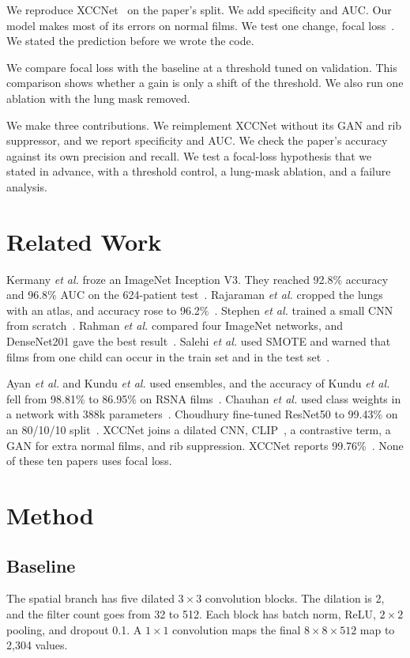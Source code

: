 \documentclass[conference]{IEEEtran}
\begin{document}
We reproduce XCCNet~\cite{raghaw2024} on the paper's split. We add specificity and AUC. Our model makes most of its errors on normal films. We test one change, focal loss~\cite{lin2017}. We stated the prediction before we wrote the code.

We compare focal loss with the baseline at a threshold tuned on validation. This comparison shows whether a gain is only a shift of the threshold. We also run one ablation with the lung mask removed.

We make three contributions. We reimplement XCCNet without its GAN and rib suppressor, and we report specificity and AUC. We check the paper's accuracy against its own precision and recall. We test a focal-loss hypothesis that we stated in advance, with a threshold control, a lung-mask ablation, and a failure analysis.

\section{Related Work}
Kermany \textit{et al.} froze an ImageNet Inception V3. They reached 92.8\% accuracy and 96.8\% AUC on the 624-patient test~\cite{kermany2018}. Rajaraman \textit{et al.} cropped the lungs with an atlas, and accuracy rose to 96.2\%~\cite{rajaraman2018}. Stephen \textit{et al.} trained a small CNN from scratch~\cite{stephen2019}. Rahman \textit{et al.} compared four ImageNet networks, and DenseNet201 gave the best result~\cite{rahman2020}. Salehi \textit{et al.} used SMOTE and warned that films from one child can occur in the train set and in the test set~\cite{salehi2021}.

Ayan \textit{et al.} and Kundu \textit{et al.} used ensembles, and the accuracy of Kundu \textit{et al.} fell from 98.81\% to 86.95\% on RSNA films~\cite{ayan2021,kundu2021}. Chauhan \textit{et al.} used class weights in a network with 388k parameters~\cite{chauhan2025}. Choudhury fine-tuned ResNet50 to 99.43\% on an 80/10/10 split~\cite{choudhury2026}. XCCNet joins a dilated CNN, CLIP~\cite{radford2021}, a contrastive term, a GAN for extra normal films, and rib suppression. XCCNet reports 99.76\%~\cite{raghaw2024}. None of these ten papers uses focal loss.

\section{Method}
\subsection{Baseline}
The spatial branch has five dilated $3\times3$ convolution blocks. The dilation is 2, and the filter count goes from 32 to 512. Each block has batch norm, ReLU, $2\times2$ pooling, and dropout 0.1. A $1\times1$ convolution maps the final $8\times8\times512$ map to 2{,}304 values.
\end{document}
